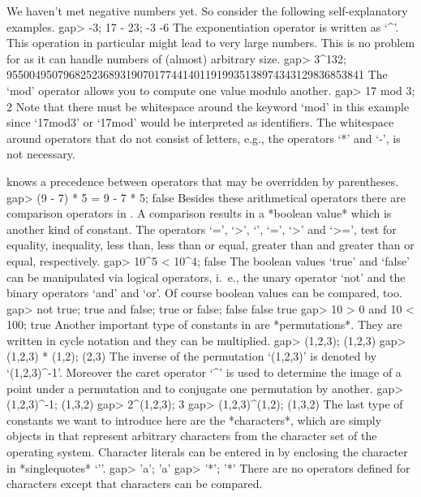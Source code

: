 We     haven't met negative numbers      yet.  So consider the  following
self-explanatory examples.
\beginexample
    gap> -3; 17 - 23;
    -3
    -6 
\endexample
The exponentiation   operator  is  written  as  `^'. This   operation  in
particular might lead  to  very large numbers.  This  is  no problem  for
{\GAP} as it can handle numbers of (almost) arbitrary size.
\beginexample
    gap> 3^132;
    955004950796825236893190701774414011919935138974343129836853841 
\endexample
The `mod' operator allows you to compute one value modulo another.
\beginexample
    gap> 17 mod 3;
    2 
\endexample
Note  that  there must be   whitespace around the  keyword  `mod' in this
example since `17mod3' or `17mod' would be interpreted as identifiers.
The whitespace around operators that do not consist of letters, e.g.,
the operators `*' and `-', is not necessary.

{\GAP}  knows a  precedence  between operators that may be overridden  by
parentheses.
\beginexample
    gap> (9 - 7) * 5 = 9 - 7  * 5;
    false 
\endexample
Besides these  arithmetical  operators there are comparison  operators in
{\GAP}. A comparison  results in a *boolean value*  which is another kind
of constant.  The operators  `=', `\<>', `\<',  `\<=', `>' and `>=', test
for equality, inequality, less than, less than or equal, greater than and
greater than or equal, respectively.
\beginexample
    gap> 10^5 < 10^4;
    false 
\endexample
The boolean values  `true' and   `false'  can be  manipulated via logical
operators, i.~e., the unary operator `not' and the binary operators `and'
and `or'.  Of course boolean values can be compared, too.
\beginexample
    gap> not true; true and false; true or false;
    false
    false
    true
    gap> 10 > 0 and 10 < 100;
    true 
\endexample
Another important  type of constants in   {\GAP} are *permutations*. They
are written in cycle notation and they can be multiplied.
\beginexample
    gap> (1,2,3);
    (1,2,3)
    gap> (1,2,3) * (1,2);
    (2,3) 
\endexample
The inverse of the   permutation  `(1,2,3)' is denoted   by `(1,2,3)^-1'.
Moreover the caret operator `^' is used to determine the image of a point
under a permutation and to conjugate one permutation by another.
\beginexample
    gap> (1,2,3)^-1;
    (1,3,2)
    gap> 2^(1,2,3);
    3
    gap> (1,2,3)^(1,2);
    (1,3,2) 
\endexample
The    last  type  of   constants  we  want  to introduce    here are the
*characters*, which are simply objects in {\GAP} that represent arbitrary
characters  from  the character set   of the  operating system. Character
literals can  be  entered   in  {\GAP} by  enclosing  the   character  in
*singlequotes* `{'}'.
\beginexample
    gap> 'a';
    'a'
    gap> '*';
    '*' 
\endexample
There are no  operators defined for characters except that characters can
be compared.

